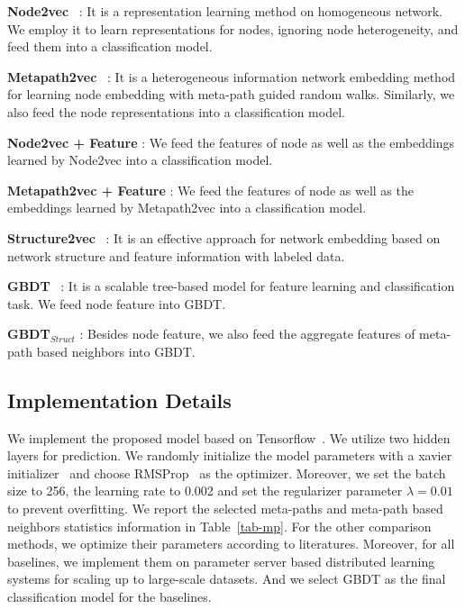 \textbullet \textbf{Node2vec}~\citep{grover2016node2vec} : It is a representation learning method on homogeneous network. We employ it to learn representations for nodes, ignoring node heterogeneity, and feed them into a classification model.

\textbullet \textbf{Metapath2vec}~\citep{dong2017metapath2vec} : It is a heterogeneous information network embedding method for learning node embedding with meta-path guided random walks. Similarly, we also feed the node representations into a classification model.

\textbullet \textbf{Node2vec + Feature} : We feed the features of node as well as the embeddings learned by Node2vec into a classification model.

\textbullet \textbf{Metapath2vec + Feature} : We feed the features of node as well as the embeddings learned by Metapath2vec into a classification model.

\textbullet \textbf{Structure2vec}~\citep{dai2016discriminative} : It is an effective approach for network embedding based on network structure and feature information with labeled data.

\textbullet \textbf{GBDT}~\citep{friedman2001greedy} : It is a scalable tree-based model for feature learning and classification task. We feed node feature  into GBDT.

\textbullet \textbf{GBDT$_{Struct}$} : Besides node feature, we also feed the aggregate features of meta-path based neighbors into GBDT.

\subsection{Implementation Details}
We implement the proposed model based on Tensorflow~\citep{abadi2016tensorflow}.  We utilize two hidden layers for prediction. We randomly initialize the model parameters with a xavier initializer~\citep{glorot2010understanding} and choose RMSProp~\citep{tieleman2012lecture} as the optimizer. Moreover, we set the batch size to 256, the learning rate to 0.002 and set the regularizer parameter $\lambda = 0.01$ to prevent overfitting. We report the selected meta-paths and meta-path based neighbors statistics information in Table~\ref{tab-mp}. For the other comparison methods, we optimize their parameters according to literatures. Moreover, for all baselines, we implement them on parameter server based distributed learning systems\citep{zhou2017kunpeng} for scaling up to large-scale datasets. And we select GBDT as the final classification model for the baselines.


